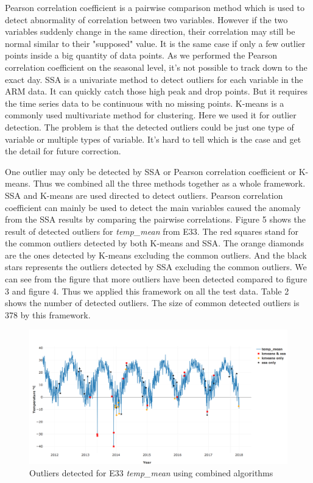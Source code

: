 \documentclass[letterpaper, 10 pt, conference]{ieeeconf}  %
\begin{document}
Pearson correlation coefficient is a pairwise comparison method which is used to detect abnormality of correlation between two variables. However if the two variables suddenly change in the same direction, their correlation may still be normal similar to their "supposed" value. It is the same case if only a few outlier points inside a big quantity of data points. As we performed the Pearson correlation coefficient on the seasonal level, it's not possible to track down to the exact day. SSA is a univariate method to detect outliers for each variable in the ARM data. It can quickly catch those high peak and drop points. But it requires the time series data to be continuous with no missing points. K-means is a commonly used multivariate method for clustering. Here we used it for outlier detection. The problem is that the detected outliers could be just one type of variable or multiple types of variable. It's hard to tell which is the case and get the detail for future correction.

One outlier may only be detected by SSA or Pearson correlation coefficient or K-means. Thus we combined all the three methods together as a whole framework. SSA and K-means are used directed to detect outliers. Pearson correlation coefficient can mainly be used to detect the main variables caused the anomaly from the SSA results by comparing the pairwise correlations. Figure 5 shows the result of detected outliers for \textit{temp\_mean} from E33. The red squares stand for the common outliers detected by both K-means and SSA. The orange diamonds are the ones detected by K-means excluding the common outliers. And the black stars represents the outliers detected by SSA excluding the common outliers. We can see from the figure that more outliers have been detected compared to figure 3 and figure 4. Thus we applied this framework on all the test data. Table 2 shows the number of detected outliers. The size of common detected outliers is 378 by this framework.

\begin{figure}[ht]
    \centering
    \includegraphics[width=\textwidth]{combined.png}
    \caption{Outliers detected for E33 \textit{temp\_mean} using combined algorithms}
    \label{fig:combined}
\end{figure}
\end{document}
